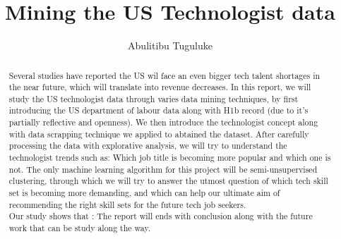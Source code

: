 \documentclass[sigconf]{acmart}
\begin{document}
	\title{Mining the US Technologist data}
	
	
	\author{Abulitibu Tuguluke}
	

		\begin{abstract}
Several studies have reported the US wil face an even bigger tech talent shortages in the near future, which will translate into revenue decreases.  In this report, we will study the US technologist data through varies data mining techniques, by first introducing the US department of labour data along with H1b record (due to it's partially reflective and openness). We then introduce the technologist concept along with data scrapping technique we applied to abtained the dataset. After carefully processing the data with explorative analysis, we will try to understand the technologist trends such as: Which job title is becoming more popular and which one is not. The only machine learning algorithm for this project will be semi-unsupervised clustering, through which we will try to answer the utmost question of which tech skill set is becoming more demanding, and which can help our ultimate aim of recommending the right skill sets for the future tech job seekers. \\
Our study shows that :  The report will ends with conclusion along with the future work that can be study along the way.
	\end{abstract}
	\maketitle

	
	
	\newpage
	
	\nocite{*}
	 
	
\end{document}
